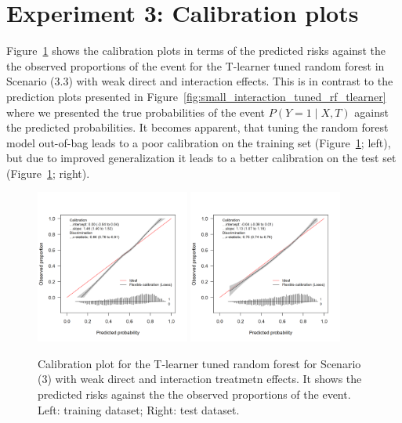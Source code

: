 \clearpage


\section{Experiment 3: Calibration plots} \label{sec:calibration_tuned_rf}

Figure~\ref{fig:calibration_tuned_rf} shows the calibration plots in terms of the predicted risks against the the observed proportions of the event for the T-learner tuned random forest in Scenario (3.3) with weak direct and interaction effects. This is in contrast to the prediction plots presented in Figure~\ref{fig:small_interaction_tuned_rf_tlearner} where we presented the true probabilities of the event $P(Y=1 \mid X, T)$ against the predicted probabilities. It becomes apparent, that tuning the random forest model out-of-bag leads to a poor calibration on the training set (Figure~\ref{fig:calibration_tuned_rf}; left), but due to improved generalization it leads to a better calibration on the test set (Figure~\ref{fig:calibration_tuned_rf}; right).

\begin{figure}[htbp]
\centering
\includegraphics[width=0.45\textwidth]{img/results_ITE_simulation/small_interaction_tuned_rf_tlearnertrain_calibration_plot.png}
\includegraphics[width=0.45\textwidth]{img/results_ITE_simulation/small_interaction_tuned_rf_tlearnertest_calibration_plot.png}
\caption{Calibration plot for the T-learner tuned random forest for Scenario (3) with weak direct and interaction treatmetn effects. It shows the predicted risks against the the observed proportions of the event. Left: training dataset; Right: test dataset.}
\label{fig:calibration_tuned_rf}
\end{figure}


